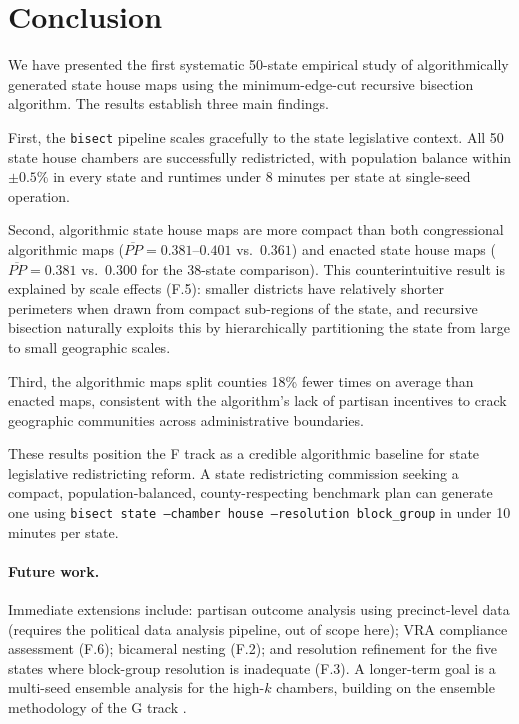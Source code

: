\section{Conclusion}
\label{sec:conclusion}

We have presented the first systematic 50-state empirical study of algorithmically
generated state house maps using the minimum-edge-cut recursive bisection
algorithm. The results establish three main findings.

First, the \texttt{bisect} pipeline scales gracefully to the state legislative
context. All 50 state house chambers are successfully redistricted, with
population balance within $\pm 0.5\%$ in every state and runtimes under
8 minutes per state at single-seed operation.

Second, algorithmic state house maps are more compact than both congressional
algorithmic maps ($\overline{PP} = 0.381$--$0.401$ vs.\ $0.361$) and enacted
state house maps ($\overline{PP} = 0.381$ vs.\ $0.300$ for the 38-state
comparison). This counterintuitive result is explained by scale effects (F.5):
smaller districts have relatively shorter perimeters when drawn from compact
sub-regions of the state, and recursive bisection naturally exploits this by
hierarchically partitioning the state from large to small geographic scales.

Third, the algorithmic maps split counties 18\% fewer times on average than
enacted maps, consistent with the algorithm's lack of partisan incentives to
crack geographic communities across administrative boundaries.

These results position the F track as a credible algorithmic baseline for
state legislative redistricting reform. A state redistricting commission
seeking a compact, population-balanced, county-respecting benchmark plan
can generate one using \texttt{bisect state --chamber house --resolution block\_group}
in under 10 minutes per state.

\paragraph{Future work.}
Immediate extensions include: partisan outcome analysis using precinct-level
data (requires the political data analysis pipeline, out of scope here);
VRA compliance assessment (F.6); bicameral nesting (F.2); and resolution
refinement for the five states where block-group resolution is inadequate (F.3).
A longer-term goal is a multi-seed ensemble analysis for the high-$k$ chambers,
building on the ensemble methodology of the G track
\citep{dellaLibera2026ensemble}.
